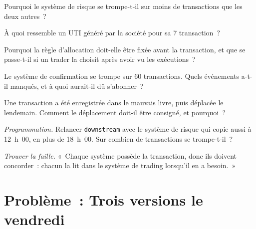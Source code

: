 \begin{exercise}[$\star$]\label{exo:pl:trade-capture-and-booking:2}
Pourquoi le système de risque se trompe-t-il sur moins de transactions que les deux autres~?
\end{exercise}

\begin{exercise}[$\star$]\label{exo:pl:trade-capture-and-booking:3}
À quoi ressemble un UTI généré par la société pour sa 7 transaction~?
\end{exercise}

\begin{exercise}[$\star\star$]\label{exo:pl:trade-capture-and-booking:4}
Pourquoi la règle d'allocation doit-elle être fixée avant la transaction, et que se passe-t-il si un trader la choisit après avoir vu les exécutions~?
\end{exercise}

\begin{exercise}[$\star\star$]\label{exo:pl:trade-capture-and-booking:5}
Le système de confirmation se trompe sur 60 transactions. Quels événements a-t-il manqués, et à quoi aurait-il dû s'abonner~?
\end{exercise}

\begin{exercise}[$\star\star$]\label{exo:pl:trade-capture-and-booking:6}
Une transaction a été enregistrée dans le mauvais livre, puis déplacée le lendemain. Comment le déplacement doit-il être consigné, et pourquoi~?
\end{exercise}

\begin{exercise}[$\star\star\star$]\label{exo:pl:trade-capture-and-booking:7}
\emph{Programmation.} Relancer \texttt{downstream} avec le système de risque qui copie aussi à 12~h~00, en plus de 18~h~00. Sur combien de transactions se trompe-t-il~?
\end{exercise}

\begin{exercise}[$\star\star\star$]\label{exo:pl:trade-capture-and-booking:8}
\emph{Trouver la faille.} «~Chaque système possède la transaction, donc ils doivent concorder~: chacun la lit dans le système de trading lorsqu'il en a besoin.~»
\end{exercise}

\section{Problème~: Trois versions le vendredi}

